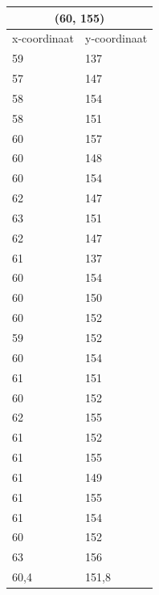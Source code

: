 \documentclass{article}
\begin{document}
\begin{tabular}{ |l|l| }
  \hline
  \multicolumn{2}{|c|}{(60, 155)} \\
  \hline
  x-coordinaat & y-coordinaat \\ \hline
     59 & 137\\ \hline
     57 & 147\\ \hline
     58 & 154\\ \hline
     58 & 151\\ \hline
     60 & 157\\ \hline
     60 & 148\\ \hline
     60 & 154\\ \hline
     62 & 147\\ \hline
     63 & 151\\ \hline
     62 & 147\\ \hline
     61 & 137\\ \hline
     60 & 154\\ \hline
     60 & 150\\ \hline
     60 & 152\\ \hline
     59 & 152\\ \hline
     60 & 154\\ \hline
     61 & 151\\ \hline
     60 & 152\\ \hline
     62 & 155\\ \hline
     61 & 152\\ \hline
     61 & 155\\ \hline
     61 & 149\\ \hline
     61 & 155\\ \hline
     61 & 154\\ \hline
     60 & 152\\ \hline
     63 & 156\\ \hline\hline
     60,4  & 151,8 \\ \hline
\end{tabular}
\end{document}
